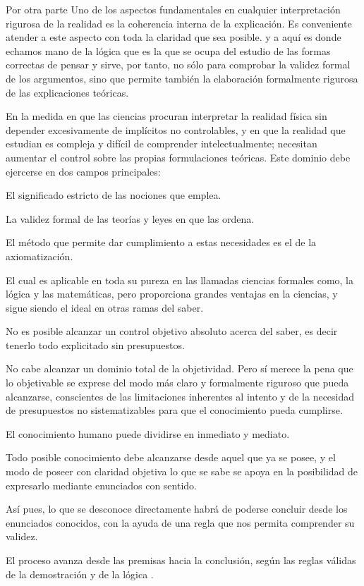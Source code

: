 Por otra parte Uno de los aspectos fundamentales en cualquier interpretación
rigurosa de la realidad es la coherencia interna de la explicación.
Es conveniente atender a este aspecto con toda la claridad que sea
posible. y a aquí es donde echamos mano de la lógica que es la que
se ocupa del estudio de las formas correctas de pensar y sirve, por
tanto, no sólo para comprobar la validez formal de los argumentos,
sino que permite también la elaboración formalmente rigurosa de las
explicaciones teóricas.

En la medida en que las ciencias procuran interpretar la realidad
física sin depender excesivamente de implícitos no controlables, y
en que la realidad que estudian es compleja y difícil de comprender
intelectualmente; necesitan aumentar el control sobre las propias
formulaciones teóricas. Este dominio debe ejercerse en dos campos
principales: 

El significado estricto de las nociones que emplea. 

La validez formal de las teorías y leyes en que las ordena. 

El método que permite dar cumplimiento a estas necesidades es el de
la axiomatización. 

El cual es aplicable en toda su pureza en las llamadas ciencias formales
como, la lógica y las matemáticas, pero proporciona grandes ventajas
en la ciencias, y sigue siendo el ideal en otras ramas del saber.

No es posible alcanzar un control objetivo absoluto acerca del saber,
es decir tenerlo todo explicitado sin presupuestos. 

No cabe alcanzar un dominio total de la objetividad. Pero sí merece
la pena que lo objetivable se exprese del modo más claro y formalmente
riguroso que pueda alcanzarse, conscientes de las limitaciones inherentes
al intento y de la necesidad de presupuestos no sistematizables para
que el conocimiento pueda cumplirse. 

El conocimiento humano puede dividirse en inmediato y mediato.

Todo posible conocimiento debe alcanzarse desde aquel que ya se posee,
y el modo de poseer con claridad objetiva lo que se sabe se apoya
en la posibilidad de expresarlo mediante enunciados con sentido.

Así pues, lo que se desconoce directamente habrá de poderse concluir
desde los enunciados conocidos, con la ayuda de una regla que nos
permita comprender su validez.

El proceso avanza desde las premisas hacia la conclusión, según las
reglas válidas de la demostración y de la lógica . 

